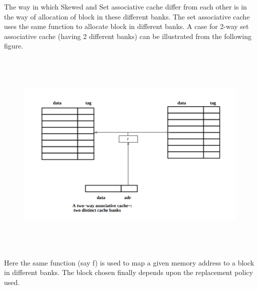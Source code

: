 \documentclass[12pt]{article}
\begin{document}
\vspace{\baselineskip}
{\fontsize{14pt}{16.8pt}\selectfont The way in which Skewed and Set associative cache differ from each other is in the way of allocation of block in these different banks. The set associative cache uses the same function to allocate block in different banks. A case for 2-way set associative cache (having 2 different banks) can be illustrated from the following figure.\par}\par




\begin{figure}[H]
	\begin{Center}
		\includegraphics[width=6.5in,height=3.97in]{./media/image1.png}
	\end{Center}
\end{figure}



\par


\vspace{\baselineskip}

\vspace{\baselineskip}

\vspace{\baselineskip}
{\fontsize{14pt}{16.8pt}\selectfont Here the same function (say f) is used to map a given memory address to a block in different banks. The block chosen finally depends upon the replacement policy used.\par}\par
\end{document}
